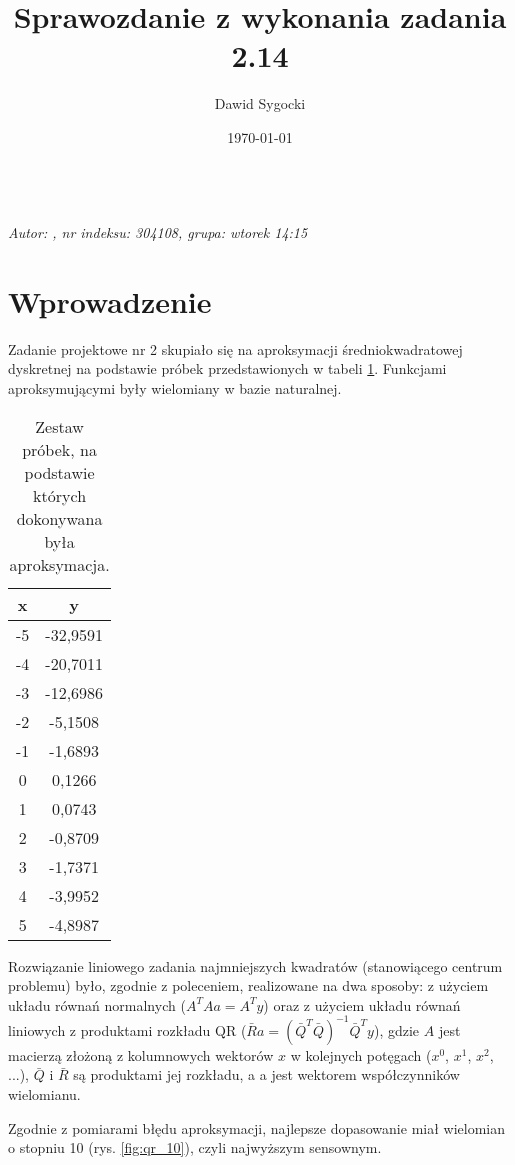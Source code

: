 \documentclass[12pt]{article}
\title{Sprawozdanie z wykonania zadania 2.14}
\author{Dawid Sygocki}
\date{\today}
\begin{document}
\makeatletter
{\huge \@title} \\
\textsl{\large Autor: \@author, nr indeksu: 304108, grupa: wtorek 14:15}
\makeatother

\section{Wprowadzenie}
Zadanie projektowe nr 2 skupiało się na aproksymacji średniokwadratowej dyskretnej na podstawie próbek przedstawionych w tabeli \ref{table:samples}. Funkcjami aproksymującymi były wielomiany w bazie naturalnej.

\begin{table}[!htbp]
\centering
\begin{tabular}{|c|c|} 
    \hline
    \textbf{x} & \textbf{y} \\
    \hline\hline
    -5  & -32,9591  \\ \hline
    -4  & -20,7011  \\ \hline
    -3  & -12,6986  \\ \hline
    -2  & -5,1508   \\ \hline
    -1  & -1,6893   \\ \hline
    0   & 0,1266    \\ \hline
    1   & 0,0743    \\ \hline
    2   & -0,8709   \\ \hline
    3   & -1,7371   \\ \hline
    4   & -3,9952   \\ \hline
    5   & -4,8987   \\ \hline
\end{tabular}
\caption{Zestaw próbek, na podstawie których dokonywana była aproksymacja.}
\label{table:samples}
\end{table}
\FloatBarrier

Rozwiązanie liniowego zadania najmniejszych kwadratów (stanowiącego centrum problemu) było, zgodnie z poleceniem, realizowane na dwa sposoby: z użyciem układu równań normalnych (\(A^{T}Aa=A^{T}y\)) oraz z użyciem układu równań liniowych z produktami rozkładu QR (\(\bar{R}a=(\bar{Q}^{T}\bar{Q})^{-1}\bar{Q}^{T}y\)), gdzie \(A\) jest macierzą złożoną z kolumnowych wektorów \(x\) w kolejnych potęgach (\(x^{0}\), \(x^{1}\), \(x^{2}\), ...), \(\bar{Q}\) i \(\bar{R}\) są produktami jej rozkładu, a a jest wektorem współczynników wielomianu.

Zgodnie z pomiarami błędu aproksymacji, najlepsze dopasowanie miał wielomian o stopniu 10 (rys. \ref{fig:qr_10}), czyli najwyższym sensownym.
\end{document}
